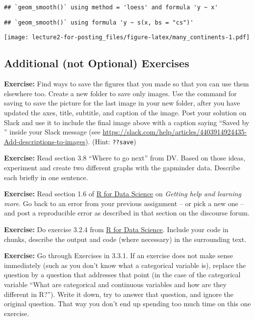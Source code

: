 \documentclass[
]{article}
\begin{document}
\begin{verbatim}
## `geom_smooth()` using method = 'loess' and formula 'y ~ x'
\end{verbatim}

\begin{verbatim}
## `geom_smooth()` using formula 'y ~ s(x, bs = "cs")'
\end{verbatim}

\texttt{[image: lecture2-for-posting\_files/figure-latex/many\_continents-1.pdf]}

\hypertarget{additional-not-optional-exercises}{%
\subsection{Additional (not Optional)
Exercises}\label{additional-not-optional-exercises}}

\textbf{Exercise:} Find ways to save the figures that you made so that
you can use them elsewhere too. Create a new folder to save only images.
Use the command for saving to save the picture for the last image in
your new folder, after you have updated the axes, title, subtitle, and
caption of the image. Post your solution on Slack and use it to include
the final image above with a caption saying ``Saved by '' inside your
Slack message (see
\url{https://slack.com/help/articles/4403914924435-Add-descriptions-to-images}).
(Hint: \texttt{??save})

\textbf{Exercise:} Read section 3.8 ``Where to go next'' from DV. Based
on those ideas, experiment and create two different graphs with the
gapminder data. Describe each briefly in one sentence.

\textbf{Exercise:} Read section 1.6 of
\href{https://r4ds.had.co.nz/introduction.html}{R for Data Science} on
\emph{Getting help and learning more}. Go back to an error from your
previous assignment -- or pick a new one -- and post a reproducible
error as described in that section on the discourse forum.

\textbf{Exercise:} Do exercise 3.2.4 from
\href{https://r4ds.had.co.nz/data-visualisation.html\#first-steps}{R for
Data Science}. Include your code in chunks, describe the output and code
(where necessary) in the surrounding text.

\textbf{Exercise:} Go through Exercises in 3.3.1. If an exercise does
not make sense immediately (such as you don't know what a categorical
variable is), replace the question by a question that addresses that
point (in the case of the categorical variable ``What are categorical
and continuous variables and how are they different in R?''). Write it
down, try to answer that question, and ignore the original question.
That way you don't end up spending too much time on this one exercise.
\end{document}

